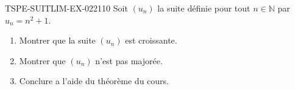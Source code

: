 \begin{exercice}{TSPE-SUITLIM-EX-022}{1}{10}
Soit $(u_n)$ la suite définie pour tout $n \in \mathbb{N}$ par $u_n = n^2 + 1$.
\begin{enumerate}
  \item Montrer que la suite $(u_n)$ est croissante.
  \item Montrer que $(u_n)$ n'est pas majorée.
  \item Conclure a l'aide du théorème du cours.
\end{enumerate}
\end{exercice}
